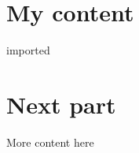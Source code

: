 \documentclass{article}
\begin{document}
\part{My content}
{imported}

\part{Next part}
More content here
\end{document}
